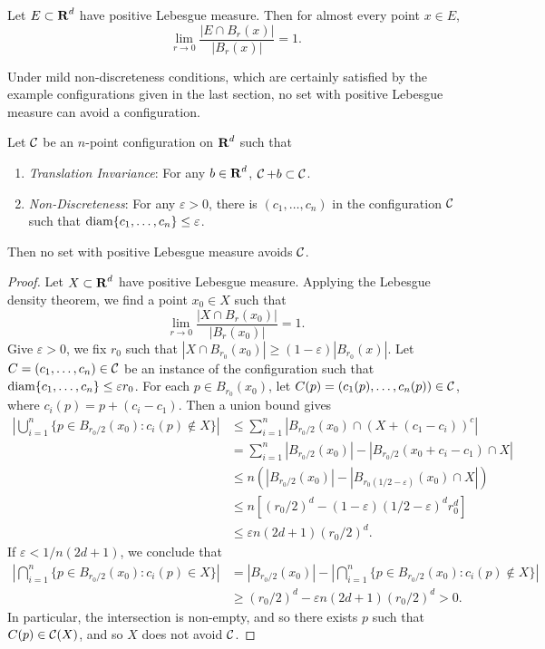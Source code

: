 \begin{theorem}
	Let $E \subset \operatorname{\mathbf{R}}^d$ have positive Lebesgue measure. Then for almost every point $x \in E$,
	\[ \lim_{r \to 0} \frac{|E \cap B_r(x)|}{|B_r(x)|} = 1. \]
\end{theorem}

Under mild non-discreteness conditions, which are certainly satisfied by the example configurations given in the last section, no set with positive Lebesgue measure can avoid a configuration.

\begin{theorem}
	Let $\operatorname{\mathcal{C}}$ be an $n$-point configuration on $\operatorname{\mathbf{R}}^d$ such that
	\begin{enumerate}
		\item \emph{Translation Invariance}: For any $b \in \operatorname{\mathbf{R}}^d$, $\operatorname{\mathcal{C}} + b \subset \operatorname{\mathcal{C}}$.
		\item \emph{Non-Discreteness}: For any $\varepsilon > 0$, there is $(c_1, \dots, c_n)$ in the configuration $\operatorname{\mathcal{C}}$ such that $\operatorname{\text{diam}} \{ c_1, \dots, c_n \} \leq \varepsilon$.
	\end{enumerate}
	Then no set with positive Lebesgue measure avoids $\operatorname{\mathcal{C}}$.
\end{theorem}
\begin{proof}
	Let $X \subset \operatorname{\mathbf{R}}^d$ have positive Lebesgue measure. Applying the Lebesgue density theorem, we find a point $x_0 \in X$ such that
	\[ \lim_{r \to 0} \frac{|X \cap B_r(x_0)|}{|B_r(x_0)|} = 1. \]
	Give $\varepsilon > 0$, we fix $r_0$ such that $|X \cap B_{r_0}(x_0)| \geq (1 - \varepsilon)|B_{r_0}(x)|$. Let $C = (c_1, \dots, c_n) \in \operatorname{\mathcal{C}}$ be an instance of the configuration such that $\operatorname{\text{diam}} \{ c_1, \dots, c_n \} \leq \varepsilon r_0$. For each $p \in B_{r_0}(x_0)$, let $C(p) = (c_1(p), \dots, c_n(p)) \in \operatorname{\mathcal{C}}$, where $c_i(p) = p + (c_i - c_1)$. Then a union bound gives
	\begin{align*}
		\left| \bigcup_{i = 1}^n \{ p \in B_{r_0/2}(x_0) : c_i(p) \not \in X \} \right| &\leq \sum_{i = 1}^n |B_{r_0/2}(x_0) \cap (X + (c_1 - c_i))^c|\\
		&= \sum_{i = 1}^n |B_{r_0/2}(x_0)| - |B_{r_0/2}(x_0 + c_i - c_1) \cap X|\\
		&\leq n \left( |B_{r_0/2}(x_0)| - |B_{r_0(1/2 - \varepsilon)}(x_0) \cap X| \right)\\
		&\leq n \left[ (r_0/2)^d - (1 - \varepsilon)(1/2 - \varepsilon)^d r_0^d \right] \\
		&\leq \varepsilon n (2d + 1) (r_0/2)^d.
	\end{align*}
	If $\varepsilon < 1/n(2d + 1)$, we conclude that
	\begin{align*}
		\left| \bigcap_{i = 1}^n \{ p \in B_{r_0/2}(x_0) : c_i(p) \in X \} \right| &= |B_{r_0/2}(x_0)| - \left| \bigcap_{i = 1}^n \{ p \in B_{r_0/2}(x_0) : c_i(p) \not \in X \} \right|\\
		&\geq (r_0/2)^d - \varepsilon n(2d + 1) (r_0/2)^d > 0.
	\end{align*}
	In particular, the intersection is non-empty, and so there exists $p$ such that $C(p) \in \operatorname{\mathcal{C}}(X)$, and so $X$ does not avoid $\operatorname{\mathcal{C}}$.
\end{proof}

